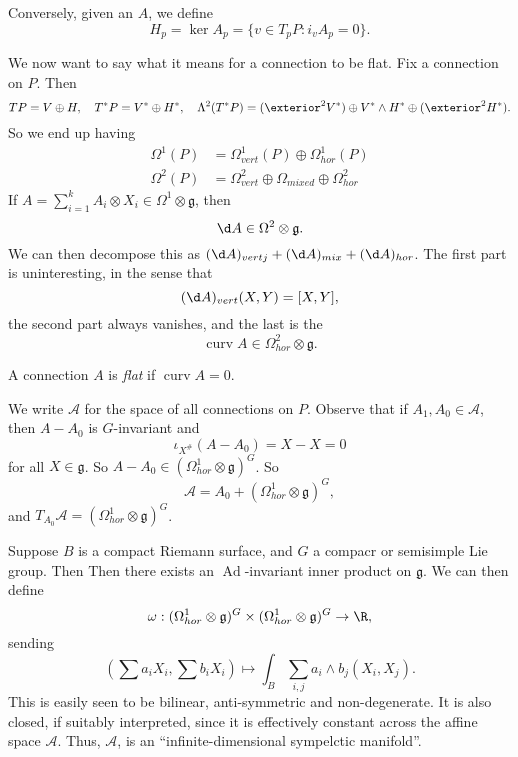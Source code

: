 \documentclass[a4paper]{article}
\DeclareMathOperator{\Ad}{Ad}
\DeclareMathOperator{\curv}{curv}
\begin{document}
\begin{eg}
  Conversely, given an $A$, we define
  \[
    H_p = \ker A_p = \{v \in T_p P : i_v A_p = 0\}.
  \]

  We now want to say what it means for a connection to be flat. Fix a connection on $P$. Then
  \[
    TP = V \oplus H,\quad T^*P = V^* \oplus H^*,\quad \Lambda^2 (T^*P) = (\exterior^2 V^*) \oplus V^* \wedge H^*  \oplus (\exterior^2 H^*).
  \]
  So we end up having
  \begin{align*}
    \Omega^1(P) &= \Omega^1_{vert}(P) \oplus \Omega^1_{hor}(P)\\
    \Omega^2(P) &= \Omega_{vert}^2 \oplus \Omega_{mixed} \oplus \Omega^2_{hor}
  \end{align*}
  If $A = \sum_{i = 1}^k A_i \otimes X_i \in \Omega^1 \otimes \mathfrak{g}$, then
  \[
    \d A \in \Omega^2 \otimes \mathfrak{g}.
  \]
  We can then decompose this as $(\d A)_{vertj}+ (\d A)_{mix} + (\d A)_{hor}$. The first part is uninteresting, in the sense that
  \[
    (\d A)_{vert}(X, Y) = [X, Y],
  \]
  the second part always vanishes, and the last is the 
  \[
    \curv A \in \Omega_{hor}^2 \otimes \mathfrak{g}.
  \]
  \begin{defi}
    A connection $A$ is \emph{flat} if $\curv A = 0$.
  \end{defi}
  We write $\mathcal{A}$ for the space of all connections on $P$. Observe that if $A_1, A_0 \in \mathcal{A}$, then $A - A_0$ is $G$-invariant and
  \[
    \iota_{X^\#}(A - A_0) = X - X = 0
  \]
  for all $X \in \mathfrak{g}$. So $A - A_0  \in (\Omega^1_{hor} \otimes \mathfrak{g})^G$. So
  \[
    \mathcal{A} = A_0 + (\Omega^1_{hor} \otimes \mathfrak{g})^G,
  \]
  and $T_{A_0} \mathcal{A} = (\Omega^1_{hor} \otimes \mathfrak{g})^G$.

  Suppose $B$ is a compact Riemann surface, and $G$ a compacr or semisimple Lie group. Then  Then there exists an $\Ad$-invariant inner product on $\mathfrak{g}$. We can then define
  \[
    \omega: (\Omega^1_{hor} \otimes \mathfrak{g})^G \times (\Omega_{hor}^1 \otimes \mathfrak{g})^G \to \R,
  \]
  sending
  \[
    \left(\sum a_i X_i, \sum b_i X_i\right) \mapsto \int_B \sum_{i, j} a_i \wedge b_j (X_i, X_j).
  \]
  This is easily seen to be bilinear, anti-symmetric and non-degenerate. It is also closed, if suitably interpreted, since it is effectively constant across the affine space $\mathcal{A}$. Thus, $\mathcal{A}$, is an ``infinite-dimensional sympelctic manifold''.


\end{eg}
\end{document}
